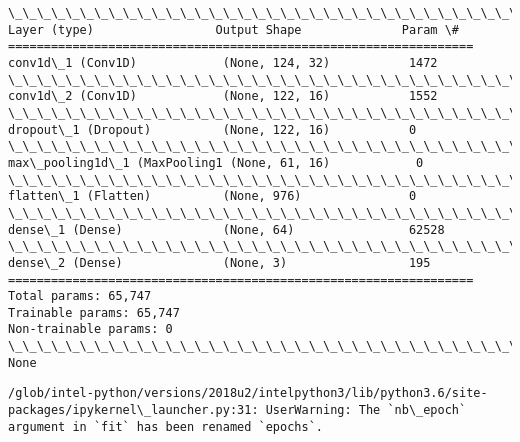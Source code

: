 \documentclass[11pt]{article}
\begin{document}
    \begin{Verbatim}[commandchars=\\\{\}]
\_\_\_\_\_\_\_\_\_\_\_\_\_\_\_\_\_\_\_\_\_\_\_\_\_\_\_\_\_\_\_\_\_\_\_\_\_\_\_\_\_\_\_\_\_\_\_\_\_\_\_\_\_\_\_\_\_\_\_\_\_\_\_\_\_
Layer (type)                 Output Shape              Param \#   
=================================================================
conv1d\_1 (Conv1D)            (None, 124, 32)           1472      
\_\_\_\_\_\_\_\_\_\_\_\_\_\_\_\_\_\_\_\_\_\_\_\_\_\_\_\_\_\_\_\_\_\_\_\_\_\_\_\_\_\_\_\_\_\_\_\_\_\_\_\_\_\_\_\_\_\_\_\_\_\_\_\_\_
conv1d\_2 (Conv1D)            (None, 122, 16)           1552      
\_\_\_\_\_\_\_\_\_\_\_\_\_\_\_\_\_\_\_\_\_\_\_\_\_\_\_\_\_\_\_\_\_\_\_\_\_\_\_\_\_\_\_\_\_\_\_\_\_\_\_\_\_\_\_\_\_\_\_\_\_\_\_\_\_
dropout\_1 (Dropout)          (None, 122, 16)           0         
\_\_\_\_\_\_\_\_\_\_\_\_\_\_\_\_\_\_\_\_\_\_\_\_\_\_\_\_\_\_\_\_\_\_\_\_\_\_\_\_\_\_\_\_\_\_\_\_\_\_\_\_\_\_\_\_\_\_\_\_\_\_\_\_\_
max\_pooling1d\_1 (MaxPooling1 (None, 61, 16)            0         
\_\_\_\_\_\_\_\_\_\_\_\_\_\_\_\_\_\_\_\_\_\_\_\_\_\_\_\_\_\_\_\_\_\_\_\_\_\_\_\_\_\_\_\_\_\_\_\_\_\_\_\_\_\_\_\_\_\_\_\_\_\_\_\_\_
flatten\_1 (Flatten)          (None, 976)               0         
\_\_\_\_\_\_\_\_\_\_\_\_\_\_\_\_\_\_\_\_\_\_\_\_\_\_\_\_\_\_\_\_\_\_\_\_\_\_\_\_\_\_\_\_\_\_\_\_\_\_\_\_\_\_\_\_\_\_\_\_\_\_\_\_\_
dense\_1 (Dense)              (None, 64)                62528     
\_\_\_\_\_\_\_\_\_\_\_\_\_\_\_\_\_\_\_\_\_\_\_\_\_\_\_\_\_\_\_\_\_\_\_\_\_\_\_\_\_\_\_\_\_\_\_\_\_\_\_\_\_\_\_\_\_\_\_\_\_\_\_\_\_
dense\_2 (Dense)              (None, 3)                 195       
=================================================================
Total params: 65,747
Trainable params: 65,747
Non-trainable params: 0
\_\_\_\_\_\_\_\_\_\_\_\_\_\_\_\_\_\_\_\_\_\_\_\_\_\_\_\_\_\_\_\_\_\_\_\_\_\_\_\_\_\_\_\_\_\_\_\_\_\_\_\_\_\_\_\_\_\_\_\_\_\_\_\_\_
None

    \end{Verbatim}

    \begin{Verbatim}[commandchars=\\\{\}]
/glob/intel-python/versions/2018u2/intelpython3/lib/python3.6/site-packages/ipykernel\_launcher.py:31: UserWarning: The `nb\_epoch` argument in `fit` has been renamed `epochs`.

    \end{Verbatim}
\end{document}
